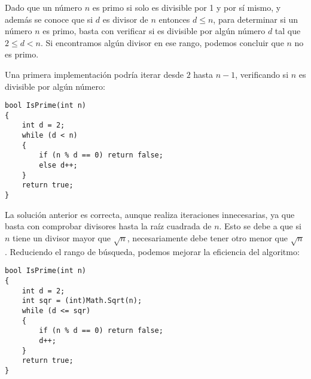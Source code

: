 Dado que un número \(n\) es primo si solo es divisible por 1 y por sí mismo, y además se conoce que si \(d\) es divisor de \(n\) entonces \(d \leq n\), para determinar si un número \(n\) es primo, basta con verificar si es divisible por algún número \(d\) tal que \(2 \leq d < n\). Si encontramos algún divisor en ese rango, podemos concluir que \(n\) no es primo.

Una primera implementación podría iterar desde \(2\) hasta \(n - 1\), verificando si \(n\) es divisible por algún número:
      
\begin{lstlisting}
bool IsPrime(int n)
{
    int d = 2;
    while (d < n)
    {
        if (n % d == 0) return false;
        else d++;
    }
    return true;
}
\end{lstlisting}
    
La solución anterior es correcta, aunque realiza iteraciones innecesarias, ya que basta con comprobar divisores hasta la raíz cuadrada de \(n\). Esto se debe a que si \(n\) tiene un divisor mayor que \(\sqrt{n}\), necesariamente debe tener otro menor que \(\sqrt{n}\). Reduciendo el rango de búsqueda, podemos mejorar la eficiencia del algoritmo:
    
\begin{lstlisting}
bool IsPrime(int n)
{
    int d = 2;
    int sqr = (int)Math.Sqrt(n);
    while (d <= sqr)
    {
        if (n % d == 0) return false;
        d++;
    }
    return true;
}
\end{lstlisting}